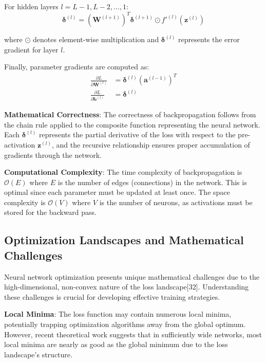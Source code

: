 \documentclass[11pt,a4paper]{report}
\begin{document}
For hidden layers $l = L-1, L-2, \ldots, 1$:
\begin{equation}
\boldsymbol{\delta}^{(l)} = (\mathbf{W}^{(l+1)})^T \boldsymbol{\delta}^{(l+1)} \odot f'^{(l)}(\mathbf{z}^{(l)})
\end{equation}

where $\odot$ denotes element-wise multiplication and $\boldsymbol{\delta}^{(l)}$ represents the error gradient for layer $l$.

Finally, parameter gradients are computed as:
\begin{align}
\frac{\partial L}{\partial \mathbf{W}^{(l)}} &= \boldsymbol{\delta}^{(l)} (\mathbf{a}^{(l-1)})^T \\
\frac{\partial L}{\partial \mathbf{b}^{(l)}} &= \boldsymbol{\delta}^{(l)}
\end{align}

\textbf{Mathematical Correctness}: The correctness of backpropagation follows from the chain rule applied to the composite function representing the neural network. Each $\boldsymbol{\delta}^{(l)}$ represents the partial derivative of the loss with respect to the pre-activation $\mathbf{z}^{(l)}$, and the recursive relationship ensures proper accumulation of gradients through the network.

\textbf{Computational Complexity}: The time complexity of backpropagation is $\mathcal{O}(E)$ where $E$ is the number of edges (connections) in the network. This is optimal since each parameter must be updated at least once. The space complexity is $\mathcal{O}(V)$ where $V$ is the number of neurons, as activations must be stored for the backward pass.

\subsection{Optimization Landscapes and Mathematical Challenges}

Neural network optimization presents unique mathematical challenges due to the high-dimensional, non-convex nature of the loss landscape[32]. Understanding these challenges is crucial for developing effective training strategies.

\textbf{Local Minima}: The loss function may contain numerous local minima, potentially trapping optimization algorithms away from the global optimum. However, recent theoretical work suggests that in sufficiently wide networks, most local minima are nearly as good as the global minimum due to the loss landscape's structure.
\end{document}
